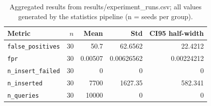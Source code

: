 
\begin{table}[htbp]
  \centering
  \caption{Aggregated results from results/experiment\_runs.csv; all values generated by the statistics pipeline (n = seeds per group).}
  \label{tab:experiment_runs}
  \begin{tabular}{lrrrr}
    \toprule
    Metric & $n$ & Mean & Std & CI95 half-width \\
    \midrule
    \texttt{false\_positives} & 30 & 50.7 & 62.6562 & 22.4212 \\
    \texttt{fpr} & 30 & 0.00507 & 0.00626562 & 0.00224212 \\
    \texttt{n\_insert\_failed} & 30 & 0 & 0 & 0 \\
    \texttt{n\_inserted} & 30 & 7700 & 1627.35 & 582.341 \\
    \texttt{n\_queries} & 30 & 10000 & 0 & 0 \\
    \bottomrule
  \end{tabular}
\end{table}
